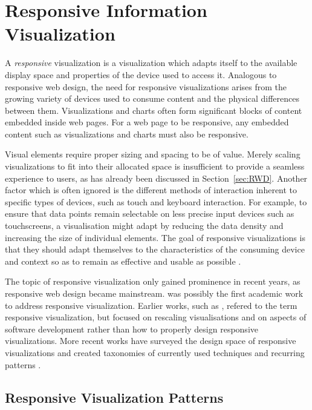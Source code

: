 
\chapter{Responsive Information Visualization}

A \emph{responsive} visualization is a visualization which adapts
itself to the available display space and properties of the device
used to access it. Analogous to responsive web design, the need for
responsive visualizations arises from the growing variety of devices
used to consume content and the physical differences between them.
Visualizations and charts often form significant blocks of content
embedded inside web pages. For a web page to be responsive, any
embedded content such as visualizations and charts must also be
responsive.

Visual elements require proper sizing and spacing to be of
value. Merely scaling visualizations to fit into their allocated space
is insufficient to provide a seamless experience to users, as has
already been discussed in Section~\ref{sec:RWD}. Another factor which
is often ignored is the different methods of interaction inherent to
specific types of devices, such as touch and keyboard interaction. For
example, to ensure that data points remain selectable on less precise
input devices such as touchscreens, a visualisation might adapt by
reducing the data density and increasing the size of individual
elements. The goal of responsive visualizations is that they should
adapt themselves to the characteristics of the consuming device and
context so as to remain as effective and usable as possible
\parencite{DesignPatternsTradeOffsRespVis}.

The topic of responsive visualization only gained prominence in recent
years, as responsive web design became mainstream. \textcite{RespVis}
was possibly the first academic work to address responsive
visualization. Earlier works, such as
\textcite{BuildingRespDataVisForTheWeb,LearningRespDataVis}, refered
to the term responsive visualization, but focused on rescaling
visualisations and on aspects of software development rather than how
to properly design responsive visualizations. More recent works have
surveyed the design space of responsive visualizations and created
taxonomies of currently used techniques and recurring patterns
\parencite{TechniquesForFlexibleRespVisDesign,DesignPatternsTradeOffsRespVis,RespVisSurvey}.




\section{Responsive Visualization Patterns}

